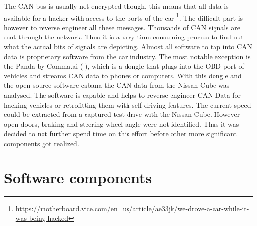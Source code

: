 The CAN bus is usually not encrypted though, this means that all data is available for a hacker with access to the ports of the car \footnote{\url{https://motherboard.vice.com/en_us/article/ae33jk/we-drove-a-car-while-it-was-being-hacked}}. The difficult part is however to reverse engineer all these messages. Thousands of CAN signals are sent through the network. Thus it is a very time consuming process to find out what the actual bits of signals are depicting.  Almost all software to tap into CAN data is proprietary software from the car industry. The most notable exception is the Panda by Comma.ai ( ), which is a dongle that plugs into the OBD port of vehicles and streams CAN data to phones or computers. With this dongle and the open source software cabana the CAN data from the Nissan Cube was analysed. The software is capable and helps to reverse engineer CAN Data for hacking vehicles or retrofitting them with self-driving features. The current speed could be extracted from a captured test drive with the Nissan Cube. However open doors, braking and steering wheel angle were not identified. Thus it was decided to not further spend time on this effort before other more significant components got realized. 

\section {Software components}

